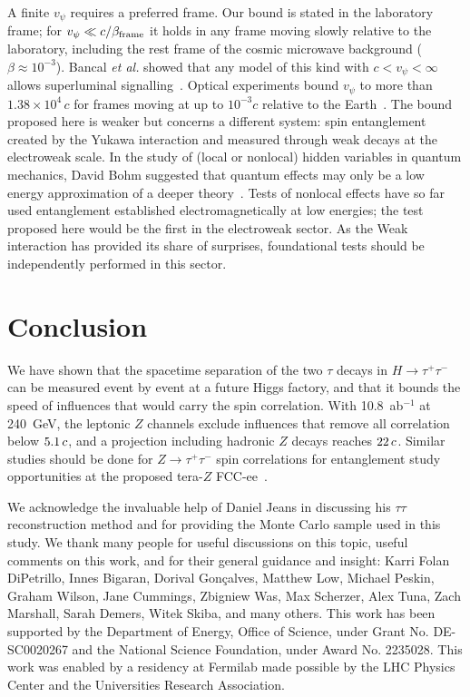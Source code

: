 \documentclass[%
 reprint,
 amsmath,amssymb,
 aps
]{revtex4-2}
\newcommand{\tautau}{\tau^+\tau^-}
\newcommand{\Htautau}{H\!\to\!\tautau}
\newcommand{\vpsi}{v_\psi}
\begin{document}
A finite $\vpsi$ requires a preferred frame. Our bound is stated in the laboratory frame; for $\vpsi\ll c/\beta_{\rm frame}$ it holds in any frame moving slowly relative to the laboratory, including the rest frame of the cosmic microwave background ($\beta\approx10^{-3}$). Bancal \emph{et al.} showed that any model of this kind with $c<\vpsi<\infty$ allows superluminal signalling~\cite{Bancal:2012mdq}. Optical experiments bound $\vpsi$ to more than $1.38\times10^4\,c$ for frames moving at up to $10^{-3}c$ relative to the Earth~\cite{Yin:2013gwh,Gisin2008,Scarani:2000tjz}. The bound proposed here is weaker but concerns a different system: spin entanglement created by the Yukawa interaction and measured through weak decays at the electroweak scale. In the study of (local or nonlocal) hidden variables in quantum mechanics, David Bohm suggested that quantum effects may only be a low energy approximation of a deeper theory~\cite{bohmI}. Tests of nonlocal effects have so far used entanglement established electromagnetically at low energies; the test proposed here would be the first in the electroweak sector. As the Weak interaction has provided its share of surprises, foundational tests should be independently performed in this sector.

\section{Conclusion}
\label{sec:conclusion}

We have shown that the spacetime separation of the two $\tau$ decays in $\Htautau$ can be measured event by event at a future Higgs factory, and that it bounds the speed of influences that would carry the spin correlation. With 10.8~ab$^{-1}$ at 240~GeV, the leptonic $Z$ channels exclude influences that remove all correlation below $5.1\,c$, and a projection including hadronic $Z$ decays reaches $22\,c$. Similar studies should be done for $Z\rightarrow\tau^+\tau^-$ spin correlations for entanglement study opportunities at the proposed tera-$Z$ FCC-ee~\cite{Blondel:2018mad}.

\acknowledgments


We acknowledge the invaluable help of Daniel Jeans in discussing his $\tau\tau$ reconstruction method and for providing the Monte Carlo sample used in this study. We thank many people for useful discussions on this topic, useful comments on this work, and for their general guidance and insight: 
Karri Folan DiPetrillo, Innes Bigaran, Dorival Gonçalves, Matthew Low, Michael Peskin, Graham Wilson, Jane Cummings, Zbigniew Was, Max Scherzer, Alex Tuna, Zach Marshall, Sarah Demers, Witek Skiba, and many others. This work has been supported by the Department of Energy, Office of Science, under Grant No. DE-SC0020267 and the National Science Foundation, under Award No. 2235028. This work was enabled by a residency at Fermilab made possible by the LHC Physics Center and the Universities Research Association.
\end{document}

